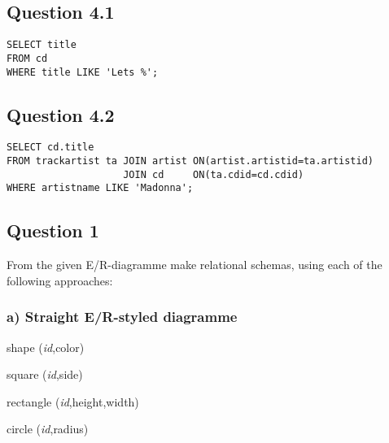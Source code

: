 \documentclass[11pt,a4paper,oneside,final,titlepage]{article}
\begin{document}
\subsection*{Question 4.1}

\begin{lstlisting}[name=Ass4.1
                  ,caption=Question 4.1
                  ,label=sql:ass4.1
                  ,firstnumber=1
                  ,style=mySQLstyle]
SELECT title
FROM cd
WHERE title LIKE 'Lets %';
\end{lstlisting}

\subsection*{Question 4.2}

\begin{lstlisting}[name=Ass4.1
                  ,caption=Question 4.2
                  ,label=sql:ass4.2
                  ,firstnumber=1
                  ,style=mySQLstyle]
SELECT cd.title
FROM trackartist ta JOIN artist ON(artist.artistid=ta.artistid)
                    JOIN cd     ON(ta.cdid=cd.cdid)
WHERE artistname LIKE 'Madonna';
\end{lstlisting}



\subsection*{Question 1}
From the given E/R-diagramme make relational schemas, using each of the 
following approaches:
\subsubsection*{a) Straight E/R-styled diagramme}
\begin{itemize*}
    \item
        \begin{description*}
            \item[shape] (\emph{id},color)
        \end{description*}
    \item
        \begin{description*}
            \item[square] (\emph{id},side)
        \end{description*}
    \item
        \begin{description*}
            \item[rectangle] (\emph{id},height,width)
        \end{description*}
    \item
        \begin{description*}
            \item[circle] (\emph{id},radius)
        \end{description*}
\end{itemize*}
\end{document}
